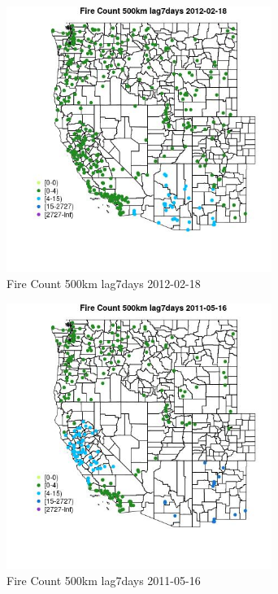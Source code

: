 \begin{figure} 
\centering  
\includegraphics[width=0.77\textwidth]{Code_Outputs/Report_ML_input_PM25_Step4_part_f_de_duplicated_aves_prioritize_24hr_obswNAs_MapObsFire_Count_500km_lag7days2012-02-18.jpg} 
\caption{\label{fig:Report_ML_input_PM25_Step4_part_f_de_duplicated_aves_prioritize_24hr_obswNAsMapObsFire_Count_500km_lag7days2012-02-18}Fire Count 500km lag7days 2012-02-18} 
\end{figure} 
 

\begin{figure} 
\centering  
\includegraphics[width=0.77\textwidth]{Code_Outputs/Report_ML_input_PM25_Step4_part_f_de_duplicated_aves_prioritize_24hr_obswNAs_MapObsFire_Count_500km_lag7days2011-05-16.jpg} 
\caption{\label{fig:Report_ML_input_PM25_Step4_part_f_de_duplicated_aves_prioritize_24hr_obswNAsMapObsFire_Count_500km_lag7days2011-05-16}Fire Count 500km lag7days 2011-05-16} 
\end{figure} 
 

